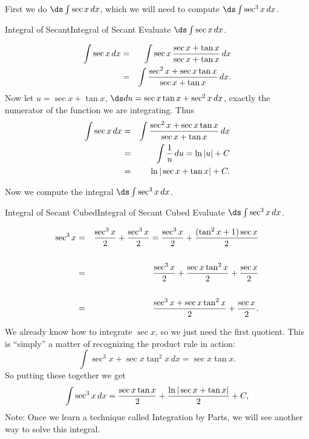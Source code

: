 First we do $\ds\int\sec x\,dx$, which we
will need to compute $\ds \int\sec^3x\,dx$.

\begin{example}{Integral of Secant}{Integral of Secant}
Evaluate $\ds\int\sec x\,dx$.
\end{example}

\begin{solution}
\begin{eqnarray*}
  \int\sec x\,dx&=&\int\sec x\,{\sec x +\tan x\over \sec x +\tan x}\,dx\cr
  &=&\int{\sec^2 x +\sec x\tan x\over \sec x +\tan x}\,dx.\cr
\end{eqnarray*}
Now let $u=\sec x +\tan x$, $\ds du=\sec x \tan x + \sec^2x\,dx$, exactly
the numerator of the function we are integrating. Thus
\begin{eqnarray*}
  \int\sec x\,dx&=&\int{\sec^2 x +\sec x\tan x\over \sec x +\tan x}\,dx\cr
	&=&\int{1\over u}\,du=\ln |u|+C\cr
  &=&\ln|\sec x +\tan x|+C.
\end{eqnarray*}
\end{solution}

Now we compute the integral $\ds \int\sec^3 x\,dx$.

\begin{example}{Integral of Secant Cubed}{Integral of Secant Cubed}
Evaluate $\ds\int\sec^3 x\,dx$.
\end{example}

\begin{solution}
\begin{eqnarray*}
  \sec^3x&=&{\sec^3x\over2}+{\sec^3x\over2}={\sec^3x\over2}+{(\tan^2x+1)\sec
    x\over 2}\cr
		\\
  &=&{\sec^3x\over2}+{\sec x \tan^2 x\over2}+{\sec x\over 2}\\
	\\
	&=&
  {\sec^3x+\sec x \tan^2x\over 2}+{\sec x\over 2}.
\end{eqnarray*}

We already know how to integrate $\sec x$, so we just need the first
quotient. This is ``simply'' a matter of recognizing the product rule
in action:
$$\int \sec^3x+\sec x \tan^2x\,dx=\sec x \tan x.$$
So putting these together we get 
$$
  \int\sec^3x\,dx={\sec x \tan x\over2}+{\ln|\sec x +\tan x|\over2}+C,
$$
Note: Once we learn a technique called Integration by Parts, we will see another way to solve this integral.
\end{solution}

